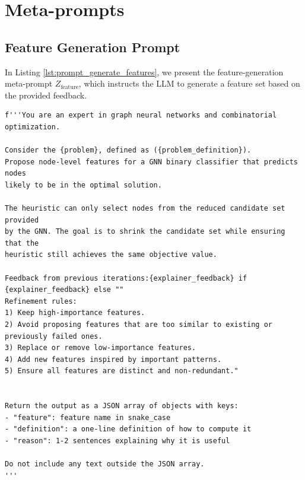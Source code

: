 \onecolumn

\appendix


\section{Meta-prompts} \label{appendix:prompts}



\subsection{Feature Generation Prompt}
In Listing \ref{lst:prompt_generate_features}, we present the feature-generation meta-prompt $Z_{\text{feature}}$, which instructs the LLM to generate a feature set based on the provided feedback.
\label{appendix:feature_generation_prompt}

\begin{listing}[h]
\caption{Prompt for generating node-level features for a GNN binary classifier.}
\label{lst:prompt_generate_features}
\begin{verbatim}
f'''You are an expert in graph neural networks and combinatorial optimization.

Consider the {problem}, defined as ({problem_definition}). 
Propose node-level features for a GNN binary classifier that predicts nodes 
likely to be in the optimal solution.

The heuristic can only select nodes from the reduced candidate set provided 
by the GNN. The goal is to shrink the candidate set while ensuring that the 
heuristic still achieves the same objective value.

Feedback from previous iterations:{explainer_feedback} if {explainer_feedback} else ""
Refinement rules:
1) Keep high-importance features.
2) Avoid proposing features that are too similar to existing or previously failed ones.
3) Replace or remove low-importance features.
4) Add new features inspired by important patterns.
5) Ensure all features are distinct and non-redundant." 


Return the output as a JSON array of objects with keys:
- "feature": feature name in snake_case
- "definition": a one-line definition of how to compute it
- "reason": 1-2 sentences explaining why it is useful

Do not include any text outside the JSON array.
'''
\end{verbatim}
\end{listing}



